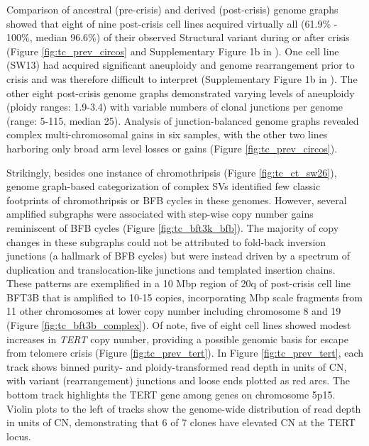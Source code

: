 \documentclass[phd,tocprelim]{cornell}
\begin{document}

Comparison of ancestral (pre-crisis) and derived (post-crisis) genome graphs showed that eight of nine post-crisis cell lines acquired virtually all (61.9\% - 100\%, median 96.6\%) of their observed Structural variant during or after crisis (Figure \ref{fig:tc_prev_circos} and Supplementary Figure 1b in \cite{Dewhurst2021-jk}). One cell line (SW13) had acquired significant aneuploidy and genome rearrangement prior to crisis and was therefore difficult to interpret (Supplementary Figure 1b in \cite{Dewhurst2021-jk}). The other eight post-crisis genome graphs demonstrated varying levels of aneuploidy (ploidy ranges: 1.9-3.4) with variable numbers of clonal junctions per genome (range: 5-115, median 25). Analysis of junction-balanced genome graphs \cite{Hadi2020-um} revealed complex multi-chromosomal gains in six samples, with the other two lines harboring only broad arm level losses or gains (Figure \ref{fig:tc_prev_circos}).

\clearpage
Strikingly, besides one instance of chromothripsis (Figure \ref{fig:tc_ct_sw26}), genome graph-based categorization of complex SVs \cite{Hadi2020-um} identified few classic footprints of chromothripsis or BFB cycles in these genomes. However, several amplified subgraphs were associated with step-wise copy number gains reminiscent of BFB cycles (Figure \ref{fig:tc_bft3k_bfb}). The majority of copy changes in these subgraphs could not be attributed to fold-back inversion junctions (a hallmark of BFB cycles) but were instead driven by a spectrum of duplication and translocation-like junctions and templated insertion chains. These patterns are exemplified in a 10 Mbp region of 20q of post-crisis cell line BFT3B that is amplified to 10-15 copies, incorporating Mbp scale fragments from 11 other chromosomes at lower copy number including chromosome 8 and 19 (Figure \ref{fig:tc_bft3b_complex}). Of note, five of eight cell lines showed modest increases in \textit{TERT} copy number, providing a possible genomic basis for escape from telomere crisis (Figure \ref{fig:tc_prev_tert}). In Figure \ref{fig:tc_prev_tert}, each track shows binned purity- and ploidy-transformed read depth in units of CN, with variant (rearrangement) junctions and loose ends plotted as red arcs. The bottom track highlights the TERT gene among genes on chromosome 5p15. Violin plots to the left of tracks show the genome-wide distribution of read depth in units of CN, demonstrating that 6 of 7 clones have elevated CN at the TERT locus.
\end{document}
